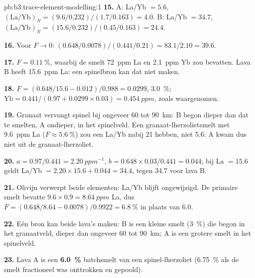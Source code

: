 \begin{solution}{pb:b3:trace-element-modelling:1}
\textbf{15.} A: La/Yb $= 5.6$, $(\mathrm{La}/\mathrm{Yb})_N =
(9.6/0.232)/(1.7/0.163) = 4.0$. B: La/Yb $= 34.7$, $(\mathrm{La}/\mathrm{Yb})_N
= (15.6/0.232)/(0.45/0.163) = 24.4$.

\textbf{16.} Voor $F \to 0$: $(0.648/0.0078)/(0.441/0.21) = 83.1/2.10 = 39.6$.

\textbf{17.} $F = \qty{0.11}{\percent}$, waarbij de smelt \qty{72}{ppm} La en
\qty{2.1}{ppm} Yb zou bevatten. Lava B heeft \qty{15.6}{ppm} La: een
spinelbron kan dat niet maken.

\textbf{18.} $F = (0.648/15.6 - 0.012)/0.988 = 0.0299$, \qty{3.0}{\percent};
$\mathrm{Yb} = 0.441/(0.97 + 0.0299\times0.03) = \qty{0.454}{ppm}$, zoals
waargenomen.

\textbf{19.} Granaat vervangt spinel bij ongeveer 60 tot \qty{90}{km}: B begon
dieper dan dat te smelten, A ondieper, in het spinelveld. Een granaat-lherzolietsmelt
met \qty{9.6}{ppm} La ($F \approx \qty{5.6}{\percent}$) zou een La/Yb nabij
21 hebben, niet 5.6: A kwam dus niet uit de granaat-lherzoliet.

\textbf{20.} $a = 0.97/0.441 = \qty{2.20}{ppm^{-1}}$, $b = 0.648\times0.03/0.441
= 0.044$; bij La $= 15.6$ geldt La/Yb $= 2.20\times15.6 + 0.044 = 34.4$, tegen
34.7 voor lava B.

\textbf{21.} Olivijn verwerpt beide elementen: La/Yb blijft ongewijzigd. De
primaire smelt bevatte $9.6\times0.9 = \qty{8.64}{ppm}$ La, dus $F = (0.648/8.64 -
0.0078)/0.9922 = \qty{6.8}{\percent}$ in plaats van 6.0.

\textbf{22.} Eén bron kan beide lava's maken: B is een kleine smelt
(\qty{3}{\percent}) die begon in het granaatveld, dieper dan ongeveer 60 tot
\qty{90}{km}; A is een grotere smelt in het spinelveld.

\textbf{23.} Lava A is een \textbf{\qty[text-series-to-math=true]{6.0}{\percent}}
batchsmelt van een spinel-lherzoliet (\qty{6.75}{\percent} als de smelt
fractioneel was onttrokken en gepoold).
\end{solution}
